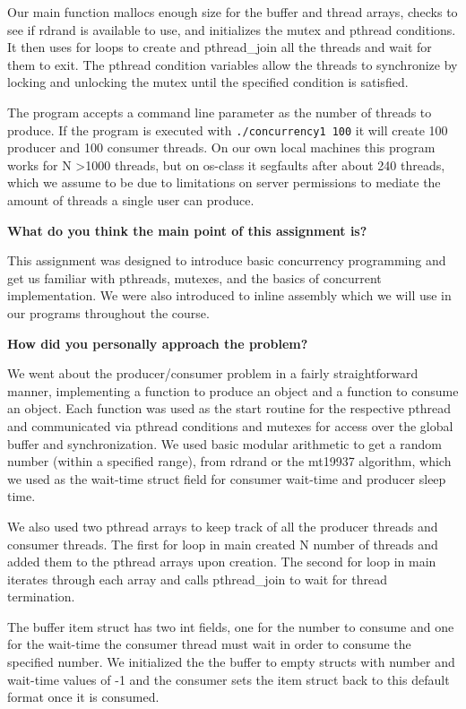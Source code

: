\documentclass[10pt,letterpaper,draftclsnofoot,onecolumn]{IEEEtran}
\begin{document}
\medskip

\noindent Our main function mallocs enough size for the buffer and thread arrays, checks to see if rdrand is available to use, and initializes the mutex and pthread conditions. It then uses for loops to create and pthread\_join all the threads and wait for them to exit. The pthread condition variables allow the threads to synchronize by locking and unlocking the mutex until the specified condition is satisfied.\par
\medskip

\medskip

\noindent The program accepts a command line parameter as the number of threads to produce. If the program is executed with \texttt{./concurrency1 100} it will create 100 producer and 100 consumer threads. On our own local machines this program works for N \textgreater 1000 threads, but on os-class it segfaults after about 240 threads, which we assume to be due to limitations on server permissions to mediate the amount of threads a single user can produce.\par
\bigskip

\bigskip

\noindent\textbf{What do you think the main point of this assignment is?}
\medskip

\noindent This assignment was designed to introduce basic concurrency programming and get us familiar with pthreads, mutexes, and the basics of concurrent implementation. We were also introduced to inline assembly which we will use in our programs throughout the course.\par
\medskip

\bigskip

\noindent\textbf{How did you personally approach the problem?}
\medskip

\noindent We went about the producer/consumer problem in a fairly straightforward manner, implementing a function to produce an object and a function to consume an object. Each function was used as the start routine for the respective pthread and communicated via pthread conditions and mutexes for access over the global buffer and synchronization. We used basic modular arithmetic to get a random number (within a specified range), from rdrand or the mt19937 algorithm, which we used as the wait-time struct field for consumer wait-time and producer sleep time.\par
\medskip
\noindent We also used two pthread arrays to keep track of all the producer threads and consumer threads. The first for loop in main created N number of threads and added them to the pthread arrays upon creation. The second for loop in main iterates through each array and calls pthread\_join to wait for thread termination.\par
\medskip
\noindent The buffer item struct has two int fields, one for the number to consume and one for the wait-time the consumer thread must wait in order to consume the specified number. We initialized the the buffer to empty structs with number and wait-time values of -1 and the consumer sets the item struct back to this default format once it is consumed.\par\pagebreak
\end{document}
